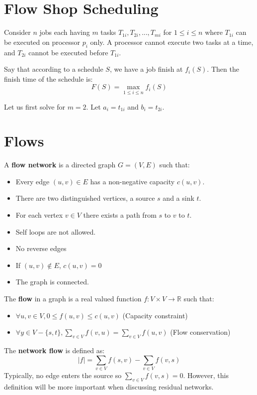 \documentclass[12pt,letterpaper]{article}
\theoremstyle{definition}
\newcommand{\R}{\mathbb{R}}
\begin{document}
\section{Flow Shop Scheduling}

Consider $n$ jobs each having $m$ tasks $T_{1i}, T_{2i}, ... , T_{mi}$ for $1 \leq i \leq n$ where $T_{1i}$ can be executed on processor $p_i$ only. A processor cannot execute two tasks at a time, and $T_{2i}$ cannot be executed before $T_{1i}$.

Say that according to a schedule $S$, we have a job finish at $f_i(S)$. Then the finish time of the schedule is:
\[F(S) = \max_{1 \leq i \leq n} f_i(S)\]

Let us first solve for $m=2$. Let $a_i = t_{1i}$ and $b_i = t_{2i}$.

\section{Flows}

A \textbf{flow network} is a directed graph $G = (V,E)$ such that:

\begin{itemize}
  \item Every edge $(u,v) \in E$ has a non-negative capacity $c(u,v)$.
  \item There are two distinguished vertices, a source $s$ and a sink $t$.
  \item For each vertex $v \in V$ there exists a path from $s$ to $v$ to $t$.
  \item Self loops are not allowed.
  \item No reverse edges
  \item If $(u,v) \notin E$, $c(u,v) = 0$
  \item The graph is connected.
\end{itemize}

The \textbf{flow} in a graph is a real valued function $f : V \times V \rightarrow \R$ such that:

\begin{itemize}
  \item $\forall u, v \in V, 0 \leq f(u,v) \leq c(u,v)$ (Capacity constraint)
  \item $\forall y \in V - \{s,t\}, \sum_{v \in V} f(v,u) = \sum_{v \in V} f(u,v)$ (Flow conservation)
\end{itemize}

The \textbf{network flow} is defined as:
\[|f| = \sum_{v \in V} f(s,v) - \sum_{v \in V} f(v,s)\]
Typically, no edge enters the source so $\sum_{v \in V} f(v,s) = 0$. However, this definition will be more important when discussing residual networks.
\end{document}
